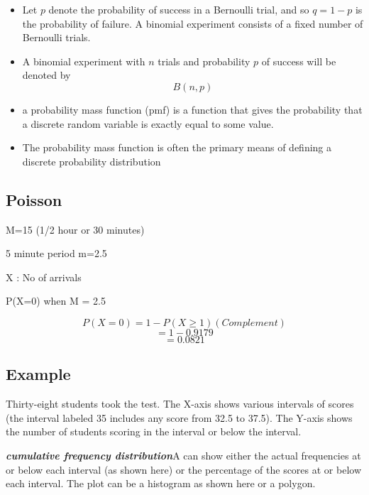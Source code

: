 \documentclass[]{article}
\begin{document}
{\Large
	\begin{itemize}
		\item
		Let $p$ denote the probability of success in a Bernoulli trial, and so $q = 1 - p$ is the probability of failure.
		A binomial experiment consists of a fixed number of Bernoulli trials. \item A binomial experiment with $n$ trials and
		probability $p$ of success will be denoted by
		\[B(n, p)\]
	\end{itemize}
}

{\Large
	\begin{itemize} \item a probability mass function (pmf) is a function that gives the probability that a discrete random variable is exactly equal to some value. \item The probability mass function is often the primary means of defining a discrete probability distribution \end{itemize}
}
\subsection{Poisson }

M=15
(1/2 hour or 30 minutes)

5 minute period 
m=2.5 

X : No of arrivals

P(X=0) when M = 2.5

\[P(X=0) = 1 - P(X \geq 1) (Complement)\]
\[= 1 - 0.9179\]
\[= 0.0821\]



\subsection{Example}
Thirty-eight students took the test. The X-axis shows various intervals of scores (the interval labeled 35 includes any score from 32.5 to 37.5). The Y-axis shows the number of students scoring in the interval or below the interval.

\textbf{\emph{cumulative frequency distribution}}A  can show either the actual frequencies at or below each interval (as shown here) or the percentage of the scores at or below each interval. The plot can be a histogram as shown here or a polygon.
\end{document}
